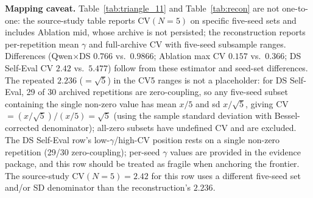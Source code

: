 \documentclass[11pt]{article}
\begin{document}
\noindent\textbf{Mapping caveat.} Table~\ref{tab:triangle_11} and Table~\ref{tab:recon} are not one-to-one: the source-study table reports $\mathrm{CV}(N{=}5)$ on specific five-seed sets and includes Ablation mid, whose archive is not persisted; the reconstruction reports per-repetition mean $\gamma$ and full-archive $\mathrm{CV}$ with five-seed subsample ranges. Differences (Qwen$\times$DS $0.766$ vs.\ $0.9866$; Ablation max CV $0.157$ vs.\ $0.366$; DS Self-Eval CV $2.42$ vs.\ $5.477$) follow from these estimator and seed-set differences. The repeated $2.236$ ($=\sqrt{5}$) in the CV5 ranges is not a placeholder: for DS Self-Eval, 29 of 30 archived repetitions are zero-coupling, so any five-seed subset containing the single non-zero value has mean $x/5$ and sd $x/\sqrt{5}$, giving CV $= (x/\sqrt{5})/(x/5) = \sqrt{5}$ (using the sample standard deviation with Bessel-corrected denominator); all-zero subsets have undefined CV and are excluded. The DS Self-Eval row's low-$\gamma$/high-$\mathrm{CV}$ position rests on a single non-zero repetition (29/30 zero-coupling); per-seed $\gamma$ values are provided in the evidence package, and this row should be treated as fragile when anchoring the frontier. The source-study $\mathrm{CV}(N{=}5){=}2.42$ for this row uses a different five-seed set and/or SD denominator than the reconstruction's $2.236$.
\end{document}
